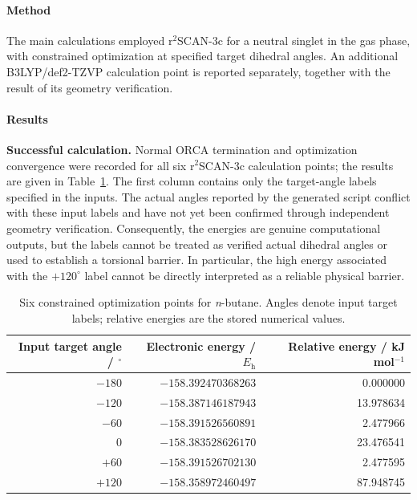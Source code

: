 \documentclass[a4paper,11pt]{article}
\newcommand{\Eh}{E_{\mathrm h}}
\begin{document}
\paragraph{Method}
The main calculations employed r$^{2}$SCAN-3c for a neutral singlet in the gas phase, with constrained optimization at specified target dihedral angles.
An additional B3LYP/def2-TZVP calculation point is reported separately, together with the result of its geometry verification.

\paragraph{Results}
\textbf{Successful calculation.} Normal ORCA termination and optimization convergence were recorded for all six r$^{2}$SCAN-3c calculation points;
the results are given in Table~\ref{tab:t3-energies}.
The first column contains only the target-angle labels specified in the inputs.
The actual angles reported by the generated script conflict with these input labels and have not yet been confirmed through independent geometry verification.
Consequently, the energies are genuine computational outputs, but the labels cannot be treated as verified actual dihedral angles or used to establish a torsional barrier.
In particular, the high energy associated with the $+120^\circ$ label cannot be directly interpreted as a reliable physical barrier.

\begin{table}[H]
  \centering\small
  \caption{Six constrained optimization points for \textit{n}-butane.
  Angles denote input target labels; relative energies are the stored numerical values.
  }
  \label{tab:t3-energies}
  \begin{tabular}{rrr}
    \toprule
    Input target angle / $^\circ$ & Electronic energy / $\Eh$ & Relative energy / kJ mol$^{-1}$\\
    \midrule
    $-180$ & $-158.392470368263$ & 0.000000\\
    $-120$ & $-158.387146187943$ & 13.978634\\
    $-60$ & $-158.391526560891$ & 2.477966\\
    $0$ & $-158.383528626170$ & 23.476541\\
    $+60$ & $-158.391526702130$ & 2.477595\\
    $+120$ & $-158.358972460497$ & 87.948745\\
    \bottomrule
  \end{tabular}
\end{table}
\end{document}
